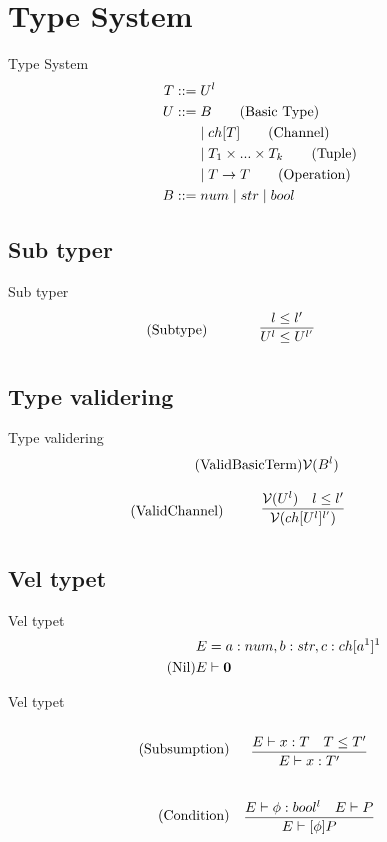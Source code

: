 \section{Type System}
\begin{frame}{Type System}
    \begin{align*}
        T::=&\;U^l\\    	
        U::=&\;B \tag{Basic Type}\\
        &\mid ch[T] \tag{Channel}\\
        &\mid T_1 \times...\times T_k \tag{Tuple}\\
        &\mid T\rightarrow T \tag{Operation}\\
        B::=&\;num 
        \mid str
        \mid bool\\
    \end{align*}
\end{frame}

\subsection{Sub typer}
\begin{frame}{Sub typer}
    \begin{align*}
       \tag{Subtype}\label{rule:Subtype} &\infrule{l\leq l'}{U^l\leq U^{l'}}
    \end{align*}
\end{frame}

\subsection{Type validering}
\begin{frame}{Type validering}
    \begin{align*}
        \tag{ValidBasicTerm}\label{rule:ValidBasicTerm} &\mathcal{V}(B^l)
    \end{align*}

    \begin{align*}
        \tag{ValidChannel}\label{rule:ValidChannel} &\infrule{\valid{U^l}\quad l\leq l'}{\valid{ch[U^l]^{l'}}}
    \end{align*}
\end{frame}

\subsection{Vel typet}
\begin{frame}{Vel typet}
    \begin{align*}
        &E=a:num, b:str, c:ch[a^1]^1\\
        \tag{Nil}\label{rule:Nil} &E \vdash \mathbf{0}
    \end{align*}
\end{frame}

\begin{frame}{Vel typet}
    \begin{align*}
        \tag{Subsumption}\label{rule:subsumption} &\infrule{E\vdash x:T\quad T\leq T'}{E\vdash x:T'}\\
        \tag{Condition}\label{rule:Condition} &\infrule{E\vdash \phi:bool^l\quad E\vdash P}{E \vdash [\phi] P}
    \end{align*}
\end{frame}
